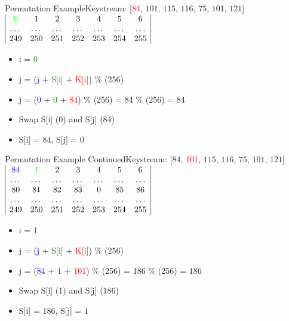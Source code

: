 \documentclass[
	aspectratio=169,	%
	onlytextwidth,		%
	t					%
	]{beamer}
\begin{document}
\begin{frame}{Permutation Example}{Keystream: [\textcolor{red} {84}, $101$, $115$, $116$, $75$, $101$, $121$]}
	\medskip
	$\begin{array}{|ccccccc|}
		\textcolor{green}{0} & 1 & 2 & 3 & 4 & 5 & 6 \\
		\dots & \dots & \dots & \dots & \dots & \dots & \dots \\
		249 & 250 & 251 & 252 & 253 & 254 & 255 \\
	\end{array}$
	\medskip
	\begin{itemize}
		\item i = \textcolor{green}{0}
		\item j = (\textcolor{blue} {j} + \textcolor{green}{S[i]} + \textcolor{red}{K[i]}) $\%$ (256)
		\item j = (\textcolor{blue} {0} + \textcolor{green} {0} + \textcolor{red} {84}) $\%$ (256) = 84 $\%$ (256) = $84$
		\item Swap S[i] (0) and S[j] (84)
		\item S[i] = $84$, S[j] = $0$
	\end{itemize}
\end{frame}

\begin{frame}{Permutation Example Continued}{Keystream: [$84$, \textcolor{red} {101}, $115$, $116$, $75$, $101$, $121$]}
	$\begin{array}{|ccccccc|}
		\textcolor{blue}{84} & \textcolor{green}{1} & 2 & 3 & 4 & 5 & 6 \\
		\dots & \dots & \dots & \dots & \dots & \dots & \dots \\
		80 & 81 & 82 & 83 & 0 & 85 & 86 \\
		\dots & \dots & \dots & \dots & \dots & \dots & \dots \\
		249 & 250 & 251 & 252 & 253 & 254 & 255 \\
	\end{array}$
	\begin{itemize}
		\item i = \textcolor{green}{1}
		\item j = (\textcolor{blue} {j} + \textcolor{green}{S[i]} + \textcolor{red}{K[i]}) $\%$ (256)
		\item j = (\textcolor{blue} {84} + \textcolor{green} {1} + \textcolor{red} {101}) $\%$ (256) = 186 $\%$ (256) = $186$
		\item Swap S[i] (1) and S[j] (186)
		\item S[i] = $186$, S[j] = $1$
	\end{itemize}
\end{frame}
\end{document}
